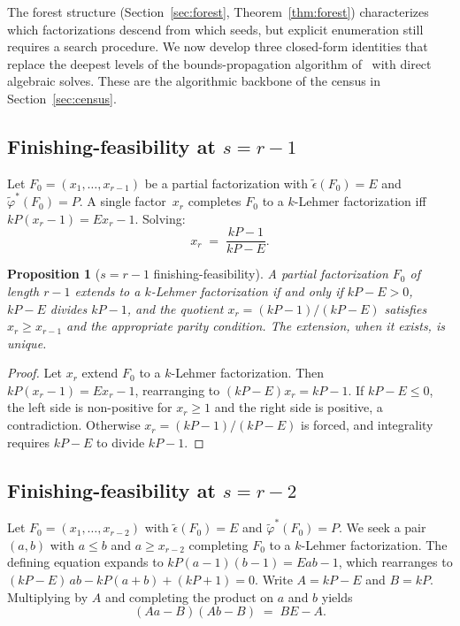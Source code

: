 \documentclass[11pt]{article}
\newtheorem{proposition}[theorem]{Proposition}
\theoremstyle{definition}
\theoremstyle{remark}
\newcommand{\eps}{\tilde{\epsilon}}
\newcommand{\phist}{\tilde{\varphi}^*}
\begin{document}
The forest structure (Section~\ref{sec:forest},
Theorem~\ref{thm:forest}) characterizes which factorizations descend
from which seeds, but explicit enumeration still requires a search
procedure.  We now develop three closed-form identities that replace
the deepest levels of the bounds-propagation algorithm of~\cite{MS26}
with direct algebraic solves.  These are the algorithmic backbone of
the census in Section~\ref{sec:census}.

\subsection{Finishing-feasibility at $s = r - 1$}

Let $F_0 = (x_1, \ldots, x_{r-1})$ be a partial factorization with
$\eps(F_0) = E$ and $\phist(F_0) = P$.  A single factor~$x_r$ completes
$F_0$ to a $k$-Lehmer factorization iff
$k P (x_r - 1) = E x_r - 1$.  Solving:
\begin{equation}\label{eq:r-1-finish}
  x_r \;=\; \frac{kP - 1}{kP - E}.
\end{equation}

\begin{proposition}[$s = r - 1$ finishing-feasibility]\label{prop:rm1}
A partial factorization $F_0$ of length $r - 1$ extends to a $k$-Lehmer
factorization if and only if $kP - E > 0$, $kP - E$ divides $kP - 1$,
and the quotient $x_r = (kP - 1)/(kP - E)$ satisfies $x_r \ge x_{r-1}$
and the appropriate parity condition.  The extension, when it exists,
is unique.
\end{proposition}

\begin{proof}
Let $x_r$ extend $F_0$ to a $k$-Lehmer factorization.  Then
$kP(x_r - 1) = E x_r - 1$, rearranging to $(kP - E) x_r = kP - 1$.
If $kP - E \le 0$, the left side is non-positive for $x_r \ge 1$ and
the right side is positive, a contradiction.  Otherwise $x_r = (kP -
1)/(kP - E)$ is forced, and integrality requires $kP - E$ to divide
$kP - 1$.
\end{proof}

\subsection{Finishing-feasibility at $s = r - 2$}

Let $F_0 = (x_1, \ldots, x_{r-2})$ with $\eps(F_0) = E$ and
$\phist(F_0) = P$.  We seek a pair $(a, b)$ with $a \le b$ and
$a \ge x_{r-2}$ completing $F_0$ to a $k$-Lehmer factorization.  The
defining equation expands to $kP(a - 1)(b - 1) = Eab - 1$, which
rearranges to $(kP - E)\,ab - kP(a + b) + (kP + 1) = 0$.  Write
$A = kP - E$ and $B = kP$.  Multiplying by $A$ and completing the
product on $a$ and $b$ yields
\begin{equation}\label{eq:finish}
  (A a - B)(A b - B) \;=\; B E - A.
\end{equation}
\end{document}
